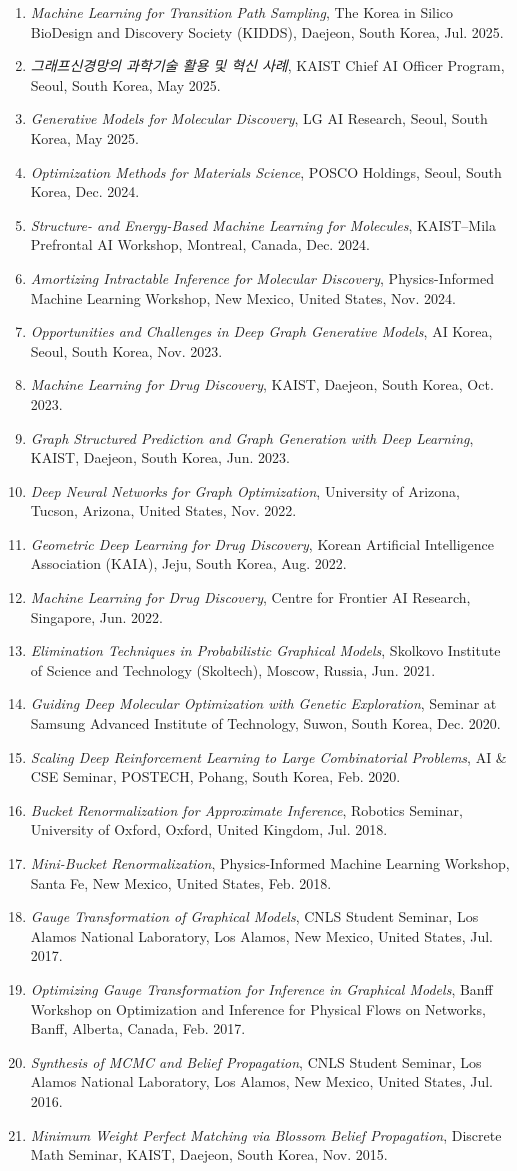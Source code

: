 \documentclass[11pt]{article}
\newcommand{\cventry}[3]{%
  \item \textit{#1}, #2, #3.%
}
\begin{document}
\begin{enumerate}
\cventry{Machine Learning for Transition Path Sampling}{The Korea in Silico BioDesign and Discovery Society (KIDDS), Daejeon, South Korea}{Jul. 2025}
\cventry{그래프신경망의 과학기술 활용 및 혁신 사례}{KAIST Chief AI Officer Program, Seoul, South Korea}{May 2025}
\cventry{Generative Models for Molecular Discovery}{LG AI Research, Seoul, South Korea}{May 2025}
\cventry{Optimization Methods for Materials Science}{POSCO Holdings, Seoul, South Korea}{Dec. 2024}
\cventry{Structure- and Energy-Based Machine Learning for Molecules}{KAIST--Mila Prefrontal AI Workshop, Montreal, Canada}{Dec. 2024}
\cventry{Amortizing Intractable Inference for Molecular Discovery}{Physics-Informed Machine Learning Workshop, New Mexico, United States}{Nov. 2024}
\cventry{Opportunities and Challenges in Deep Graph Generative Models}{AI Korea, Seoul, South Korea}{Nov. 2023}
\cventry{Machine Learning for Drug Discovery}{KAIST, Daejeon, South Korea}{Oct. 2023}
\cventry{Graph Structured Prediction and Graph Generation with Deep Learning}{KAIST, Daejeon, South Korea}{Jun. 2023}
\cventry{Deep Neural Networks for Graph Optimization}{University of Arizona, Tucson, Arizona, United States}{Nov. 2022}
\cventry{Geometric Deep Learning for Drug Discovery}{Korean Artificial Intelligence Association (KAIA), Jeju, South Korea}{Aug. 2022}
\cventry{Machine Learning for Drug Discovery}{Centre for Frontier AI Research, Singapore}{Jun. 2022}
\cventry{Elimination Techniques in Probabilistic Graphical Models}{Skolkovo Institute of Science and Technology (Skoltech), Moscow, Russia}{Jun. 2021}
\cventry{Guiding Deep Molecular Optimization with Genetic Exploration}{Seminar at Samsung Advanced Institute of Technology, Suwon, South Korea}{Dec. 2020}
\cventry{Scaling Deep Reinforcement Learning to Large Combinatorial Problems}{AI \& CSE Seminar, POSTECH, Pohang, South Korea}{Feb. 2020}
\cventry{Bucket Renormalization for Approximate Inference}{Robotics Seminar, University of Oxford, Oxford, United Kingdom}{Jul. 2018}
\cventry{Mini-Bucket Renormalization}{Physics-Informed Machine Learning Workshop, Santa Fe, New Mexico, United States}{Feb. 2018}
\cventry{Gauge Transformation of Graphical Models}{CNLS Student Seminar, Los Alamos National Laboratory, Los Alamos, New Mexico, United States}{Jul. 2017}
\cventry{Optimizing Gauge Transformation for Inference in Graphical Models}{Banff Workshop on Optimization and Inference for Physical Flows on Networks, Banff, Alberta, Canada}{Feb. 2017}
\cventry{Synthesis of MCMC and Belief Propagation}{CNLS Student Seminar, Los Alamos National Laboratory, Los Alamos, New Mexico, United States}{Jul. 2016}
\cventry{Minimum Weight Perfect Matching via Blossom Belief Propagation}{Discrete Math Seminar, KAIST, Daejeon, South Korea}{Nov. 2015}
\end{enumerate}
\endgroup
\end{document}
